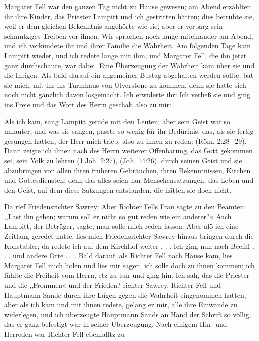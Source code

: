 Margaret 
Fell war den ganzen
Tag nicht zu Hause gewesen; am Abend erzählten ihr ihre Kinder,
das Priester Lampitt und ich gestritten hätten; dies betrübte sie,
weil er dem gleichen Bekenntnis angehörte wie sie; aber er
verbarg sein schmutziges Treiben vor ihnen.
Wir sprachen noch lange miteinander am Abend, und ich verkündete
ihr und ihrer Familie die Wahrheit. Am folgenden Tage
kam Lampitt wieder, und ich redete lange mit ihm, und Margaret
Fell, die ihn jetzt ganz durchschaute, war dabei. Eine 
Überzeugung der Wahrheit kam über sie und die Ihrigen. Als bald
darauf ein allgemeiner Bustag abgehalten 
werden sollte, bat sie
mich, mit ihr ins Turmhaus von Ulverstone zu kommen, denn
sie hatte sich noch nicht gänzlich davon losgemacht. Ich erwiderte
ihr:  Ich verließ sie
und ging ins Freie und das Wort des Herrn geschah also zu
mir:  


Als ich kam, sang
Lampitt gerade mit den Leuten; aber sein Geist war so unlauter,
und was sie sangen, passte so wenig 
für ihr Bedürfnis, das, als
sie fertig gesungen hatten, der Herr mich trieb, also zu ihnen zu
reden:  
(Röm. 2:28+29).
Dann zeigte ich ihnen nach des Herrn weiterer Offenbarung, das
Gott gekommen sei, sein Volk zu lehren 
(1.Joh. 2:27), 
(Joh. 14:26).
durch seinen Geist und sie abzubringen von allen ihren früheren
Gebräuchen, ihren Bekenntnissen, Kirchen und Gottesdiensten;
denn das alles seien nur Menschensatzungen; das Leben und den
Geist, auf dem diese Satzungen entstanden, die hätten sie doch
nicht. 

Da rief Friedensrichter Sawrey: 
 Aber
Richter Fells Frau sagte zu den Beamten: ,,Last ihn gehen;
warum soll er nicht so gut reden wie ein anderer?« Auch Lampitt,
der Betrüger, sagte, man solle mich reden lassen. Aber alö ich eine
Zeitlang geredet hatte, lies mich Friedensrichter Sawrey hinaus
bringen durch die Konstabler; da redete ich auf dem Kirchhof
weiter . . . Ich ging nun nach Becliff . . . und andere Orte . . .
Bald darauf, als Richter Fell nach Hause kam, lies Margaret
Fell mich holen und lies mir sagen, ich solle doch zu ihnen
kommen; ich fühlte die Freiheit vom Herrn, etz zu tun und ging
hin. Ich sah, das die Priester und die ,,Frommen« und der
Frieden?-richter Sawrey, Richter Fell und Hauptmann Sande durch
ihre Lügen gegen die Wahrheit eingenommen hatten, aber als ich
kam und mit ihnen redete, gelang ez mir, alle ihre Einwände zu
widerlegen, und ich überzeugte Hauptmann Sands an Hand der
Schrift so völlig, das er ganz befestigt war in seiner Uberzeugung.
Nach einigem Hin- und Herreden war Richter Fell ebenfalltz zu-


